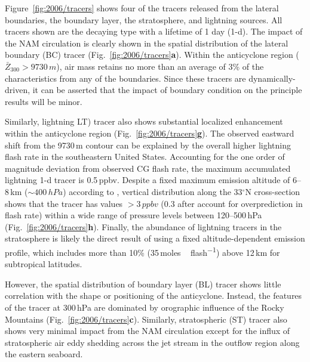 Figure~\ref{fig:2006/tracers} shows four of the tracers released from the lateral boundaries, the boundary layer, the stratosphere, and
lightning sources. All tracers shown are the decaying type with a lifetime of 1 day (1-d). The impact of the NAM circulation is clearly shown
in the spatial distribution of the lateral boundary (BC) tracer (Fig.~\ref{fig:2006/tracers}{\bf a}). Within the anticyclone region ($\bar{Z}_{300}
>9730\,\unit{m}$), air mass retains no more than an average of 3\% of the characteristics from any of the boundaries. Since these
tracers are dynamically-driven, it can be asserted that the impact of boundary condition on the principle results will be minor.

Similarly, lightning LT) tracer also shows substantial localized enhancement within the anticyclone region (Fig.~\ref{fig:2006/tracers}{\bf g}).
The observed eastward shift from the 9730\,\unit{m} contour can be explained by the overall higher lightning flash rate in the southeastern 
United States. Accounting for the one order of magnitude deviation from observed CG flash rate, the maximum accumulated lightning
1-d tracer is 0.5\,\unit{ppbv}. Despite a fixed maximum emission altitude of 6--8\,\unit{km} ($\sim400\,\unit{hPa}$) according to
\citet{Ott:2010lo}, vertical distribution along the 33$^\circ$N cross-section shows that the tracer has values $>3\,\unit{ppbv}$ (0.3
after account for overprediction in flash rate) within a wide range of pressure levels between 120--500\,\unit{hPa}
(Fig.~\ref{fig:2006/tracers}{\bf h}). Finally, the abundance of lightning tracers in the stratosphere is likely the direct result of using a
fixed altitude-dependent emission profile, which includes more than 10\% (35\,\unit{moles\,flash^{-1}}) above 12\,\unit{km} for
subtropical latitudes.

However, the spatial distribution of boundary layer (BL) tracer shows little correlation with the shape or positioning of the anticyclone. Instead,
the features of the tracer at 300\,\unit{hPa} are dominated by orographic influence of the Rocky Mountains (Fig.~\ref{fig:2006/tracers}{\bf c}).
Similarly, stratospheric (ST) tracer also shows very minimal impact from the NAM circulation except for the influx of stratospheric air eddy
shedding across the jet stream in the outflow region along the eastern seaboard.


